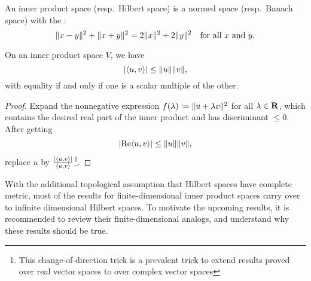 \begin{prop}
    An inner product space (resp.\ Hilbert space) is a normed space (resp.\ Banach space) with the : \[
        \lVert x - y \rVert^2 + \lVert x + y \rVert^2 = 2 \lVert x \rVert^2 + 2\lVert y \rVert^2 \quad \text{for all }x\text{ and }y.
    \]
\end{prop}

\begin{namedthm} \label{thm:Cauchy-Schwarz}
    On an inner product space $V$, we have \[
        \lvert \langle u, v \rangle \rvert \leq \lVert u \rVert\lVert v \rVert,
    \] with equality if and only if one is a scalar multiple of the other.
\end{namedthm}
\begin{proof}
    Expand the nonnegative expression $f(\lambda) \coloneqq \lVert u+\lambda v \rVert^2$ for all $\lambda\in \mathbf{R}$, which contains the desired real part of the inner product and has discriminant $\leq 0$. After getting \[
        \lvert \operatorname{Re} \langle u, v \rangle \rvert \leq \lVert u \rVert\lVert v \rVert,
    \] replace $u$ by $\frac{\lvert \langle u, v \rangle \rvert}{\langle u, v \rangle}$\footnote{This change-of-direction trick is a prevalent trick to extend results proved over real vector spaces to over complex vector spaces}.
\end{proof}

With the additional topological assumption that Hilbert spaces have complete metric, most of the results for finite-dimensional inner product spaces carry over to infinite dimensional Hilbert spaces. To motivate the upcoming results, it is recommended to review their finite-dimensional analogs, and understand why these results should be true.

